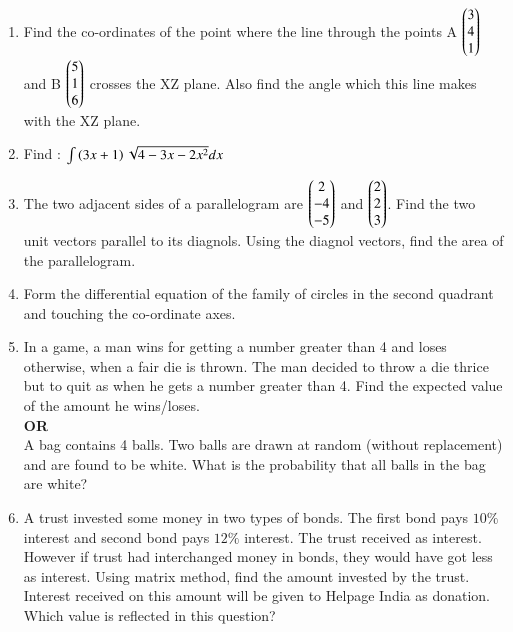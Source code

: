 \documentclass[journal,12pt,onecolumn]{IEEEtran}
\theoremstyle{remark}
\begin{document}
\begin{enumerate}
	\item Find the co-ordinates of the point where the line through the points A $\begin{pmatrix}3\\4\\1\end{pmatrix} $ and B $\begin{pmatrix}5\\1\\6\end{pmatrix}$ crosses the XZ plane. Also find the angle which this line makes with the XZ plane.\\
	
	\item Find : $\int{\ensuremath{\left(3x+1\right)}\sqrt{4 - 3x - 2x^2}dx}$\\
	
	\item The two adjacent sides of a parallelogram  are $\begin{pmatrix}2\\-4\\-5\end{pmatrix}$ and $\begin{pmatrix}2\\2\\3\end{pmatrix}$. Find the two unit vectors parallel to its diagnols. Using the diagnol vectors, find the area of the parallelogram.\\
	
	\item Form the differential equation of the family of circles in the second quadrant and touching the co-ordinate axes.\\
	
	\item In a game, a man wins  for getting a number greater than 4 and loses  otherwise, when a fair die is thrown. The man decided to throw a die thrice but to quit as when he gets a number greater than 4. Find the expected value of the amount he wins/loses.\\
	\textbf{OR}\\
	A bag contains 4 balls. Two balls are drawn at random (without replacement) and are found to be white. What is the probability that all balls in the bag are white?\\
	
	\item A trust invested some money in two types of bonds. The first bond pays $10\%$ interest and second bond pays $12\%$ interest. The trust received  as interest. However if trust had interchanged money in bonds, they would have got  less as interest. Using matrix method, find the amount invested by the trust. Interest received on this amount will be given to Helpage India as donation. Which value is reflected in this question?\\
	

\end{enumerate}
\end{document}
